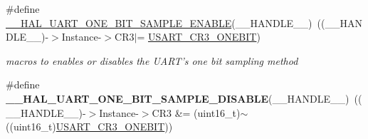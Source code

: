 \begin{DoxyCompactItemize}
\#define \hyperlink{group___u_a_r_t___exported___macros_ga3524747e5896296ab066d786431503ce}{\-\_\-\-\_\-\-H\-A\-L\-\_\-\-U\-A\-R\-T\-\_\-\-O\-N\-E\-\_\-\-B\-I\-T\-\_\-\-S\-A\-M\-P\-L\-E\-\_\-\-E\-N\-A\-B\-L\-E}(\-\_\-\-\_\-\-H\-A\-N\-D\-L\-E\-\_\-\-\_\-)~((\-\_\-\-\_\-\-H\-A\-N\-D\-L\-E\-\_\-\-\_\-)-\/$>$Instance-\/$>$C\-R3$\vert$= \hyperlink{group___peripheral___registers___bits___definition_ga9a96fb1a7beab602cbc8cb0393593826}{U\-S\-A\-R\-T\-\_\-\-C\-R3\-\_\-\-O\-N\-E\-B\-I\-T})
\begin{DoxyCompactList}\small\item\em macros to enables or disables the U\-A\-R\-T's one bit sampling method \end{DoxyCompactList}\item 
\hypertarget{group___u_a_r_t___exported___macros_ga2dbd7e6592e8c5999f817b69f0fd24bb}{\#define {\bfseries \-\_\-\-\_\-\-H\-A\-L\-\_\-\-U\-A\-R\-T\-\_\-\-O\-N\-E\-\_\-\-B\-I\-T\-\_\-\-S\-A\-M\-P\-L\-E\-\_\-\-D\-I\-S\-A\-B\-L\-E}(\-\_\-\-\_\-\-H\-A\-N\-D\-L\-E\-\_\-\-\_\-)~((\-\_\-\-\_\-\-H\-A\-N\-D\-L\-E\-\_\-\-\_\-)-\/$>$Instance-\/$>$C\-R3 \&= (uint16\-\_\-t)$\sim$((uint16\-\_\-t)\hyperlink{group___peripheral___registers___bits___definition_ga9a96fb1a7beab602cbc8cb0393593826}{U\-S\-A\-R\-T\-\_\-\-C\-R3\-\_\-\-O\-N\-E\-B\-I\-T}))}\label{group___u_a_r_t___exported___macros_ga2dbd7e6592e8c5999f817b69f0fd24bb}


\end{DoxyCompactItemize}
